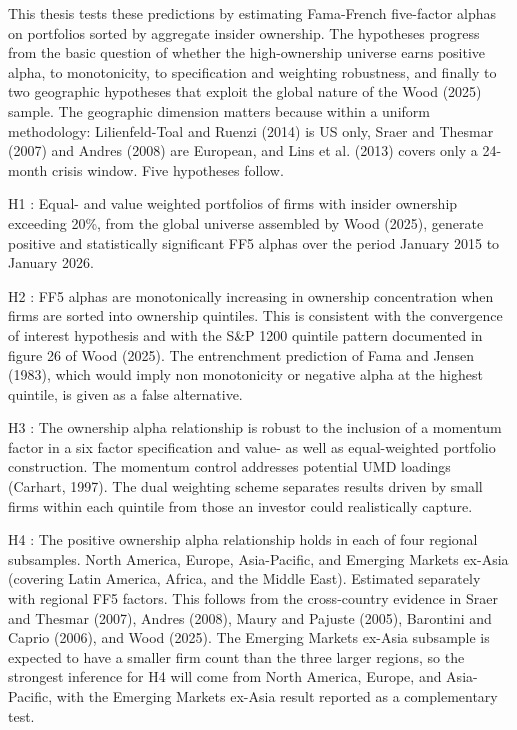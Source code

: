 This thesis tests these predictions by estimating Fama-French five-factor alphas on portfolios sorted by aggregate insider ownership. The hypotheses progress from the basic question of whether the high-ownership universe earns positive alpha, to monotonicity, to specification and weighting robustness, and finally to two geographic hypotheses that exploit the global nature of the Wood (2025) sample. The geographic dimension matters because within a uniform methodology: Lilienfeld-Toal and Ruenzi (2014) is US only, Sraer and Thesmar (2007) and Andres (2008) are European, and Lins et al. (2013) covers only a 24-month crisis window. Five hypotheses follow.

H1 : Equal- and value weighted portfolios of firms with insider ownership exceeding 20\%, from the global universe assembled by Wood (2025), generate positive and statistically significant FF5 alphas over the period January 2015 to January 2026. 

H2 : FF5 alphas are monotonically increasing in ownership concentration when firms are sorted into ownership quintiles. This is consistent with the convergence of interest hypothesis and with the S\&P 1200 quintile pattern documented in figure 26 of Wood (2025). The entrenchment prediction of Fama and Jensen (1983), which would imply non monotonicity or negative alpha at the highest quintile, is given as a false alternative.

H3 : The ownership alpha relationship is robust to the inclusion of a momentum factor in a six factor specification and value- as well as equal-weighted portfolio construction. The momentum control addresses potential UMD loadings (Carhart, 1997). The dual weighting scheme separates results driven by small firms within each quintile from those an investor could realistically capture.

H4 : The positive ownership alpha relationship holds in each of four regional subsamples. North America, Europe, Asia-Pacific, and Emerging Markets ex-Asia (covering Latin America, Africa, and the Middle East). Estimated separately with regional FF5 factors. This follows from the cross-country evidence in Sraer and Thesmar (2007), Andres (2008), Maury and Pajuste (2005), Barontini and Caprio (2006), and Wood (2025). The Emerging Markets ex-Asia subsample is expected to have a smaller firm count than the three larger regions, so the strongest inference for H4 will come from North America, Europe, and Asia-Pacific, with the Emerging Markets ex-Asia result reported as a complementary test.

